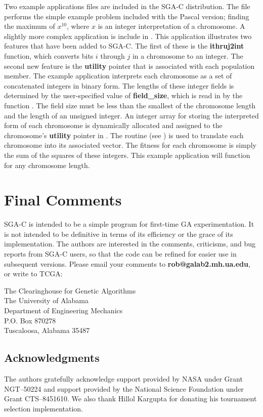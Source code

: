 Two example applications files are included in the SGA-C distribution.  The
file {} performs the simple example problem 
included with the Pascal version; 
finding the maximum of $x^{10}$, where $x$
is an integer interpretation of a chromosome.  
A slightly more complex 
application 
is include in {}.
This application illustrates two features that have been added
to SGA-C. The first of these is the {\bf ithruj2int} function,
which converts bits $i$ through $j$ in a chromosome to an integer.
The second new feature is the {\bf utility} pointer that is associated with each population member.
The example application interprets each chromosome as a set 
of concatenated integers in binary form. The lengths of these integer fields is 
determined by the user-specified value of {\bf field\_size}, which is 
read in by the function
{}.  The field size must be less than the smallest of
the chromosome
length and the length of an unsigned integer.  
An integer array for storing the interpreted form of each chromosome
is dynamically allocated and assigned to the chromosome's {\bf utility} pointer
in {}.
The {} routine (see {}) is used to translate 
each chromosome into its associated vector.
The fitness for each chromosome is simply the sum of the squares of these 
integers. This example application will function for any chromosome length. 

\section{Final Comments}
SGA-C is intended to be a simple
program for first-time GA experimentation. It is 
not intended to be 
definitive in terms of its efficiency 
or the grace of its implementation. The
authors are interested in the comments, criticisms, and bug reports
from SGA-C users, so that the code can be refined for
easier use in subsequent versions.
Please email your comments to {\bf rob@galab2.mh.ua.edu},
or write to TCGA:
\begin{center}
The Clearinghouse for Genetic Algorithms\\
The University of Alabama\\
Department of Engineering Mechanics\\
P.O. Box 870278\\
Tuscaloosa, Alabama 35487
\end{center}

\subsection*{Acknowledgments}
The authors gratefully acknowledge support provided by NASA under
Grant NGT--50224 and support provided by the 
National Science Foundation under Grant CTS--8451610.
We also thank Hillol Kargupta for donating his tournament selection
implementation.



\nocite{*}


